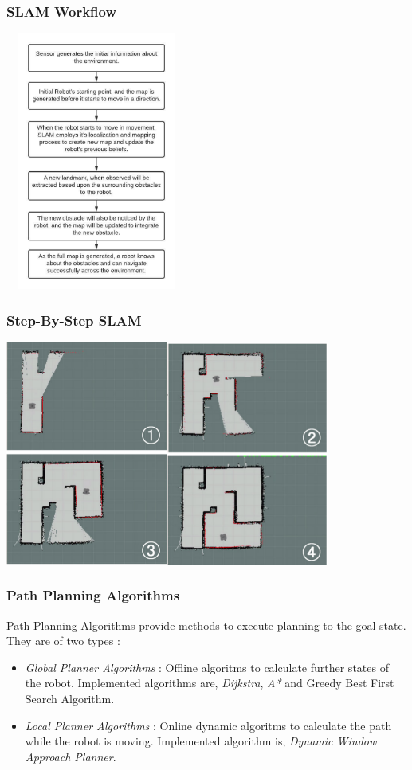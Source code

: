 \documentclass{beamer}
\begin{document}
\begin{frame}
    \frametitle{SLAM Workflow}
    \includegraphics[width=6cm, height=8.5cm]{images/SLAM_flowchart.jpeg}
\end{frame}

\begin{frame}
    \frametitle{Step-By-Step SLAM}
    \includegraphics[width=0.8\textwidth]{images/SLAM.png}
\end{frame}

\begin{frame}
    \frametitle{Path Planning Algorithms}
    Path Planning Algorithms provide methods to execute planning to the goal state. They are of two types : 
    \begin{itemize}
        \item \textit{Global Planner Algorithms} : Offline algoritms to calculate further states of the robot. Implemented algorithms are, \textit{Dijkstra}, \textit{A*} and Greedy Best First Search Algorithm.
        \item \textit{Local Planner Algorithms} : Online dynamic algoritms to calculate the path while the robot is moving. Implemented algorithm is, \textit{Dynamic Window Approach Planner}. 
    \end{itemize}
\end{frame}
\end{document}
